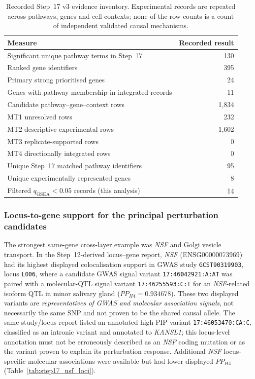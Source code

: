 \documentclass[11pt,a4paper]{article}
\begin{document}
\begin{table}[!htbp]
\centering\small
\caption{Recorded Step~17 v3 evidence inventory. Experimental records are repeated across pathways, genes and cell contexts; none of the row counts is a count of independent validated causal mechanisms.}
\label{tab:step17_inventory}
\begin{tabular}{@{}lr@{}}\toprule
Measure & Recorded result\\\midrule
Significant unique pathway terms in Step~17 & 130\\
Ranked gene identifiers & 395\\
Primary strong prioritised genes & 24\\
Genes with pathway membership in integrated records & 11\\
Candidate pathway--gene--context rows & 1,834\\
MT1 unresolved rows & 232\\
MT2 descriptive experimental rows & 1,602\\
MT3 replicate-supported rows & 0\\
MT4 directionally integrated rows & 0\\
Unique Step~17 matched pathway identifiers & 95\\
Unique experimentally represented genes & 8\\
Filtered $q_{\mathrm{GSEA}}<0.05$ records (this analysis) & 14\\
\bottomrule\end{tabular}
\end{table}

\subsubsection{Locus-to-gene support for the principal perturbation candidates}
\label{subsec:step17_variant_linkage}
The strongest same-gene cross-layer example was \textit{NSF} and Golgi vesicle transport. In the Step~12-derived locus--gene report, \textit{NSF} (ENSG00000073969) had its highest displayed colocalisation support in GWAS study \texttt{GCST90319903}, locus \texttt{L006}, where a candidate GWAS signal variant \texttt{17:46042921:A:AT} was paired with a molecular-QTL signal variant \texttt{17:46255593:C:T} for an \textit{NSF}-related isoform QTL in minor salivary gland ($PP_{H4}=0.934678$). These two displayed variants are \emph{representatives of GWAS and molecular association signals}, not necessarily the same SNP and not proven to be the shared causal allele. The same study/locus report listed an annotated high-PIP variant \texttt{17:46053470:CA:C}, classified as an intronic variant and annotated to \textit{KANSL1}; this locus-level annotation must not be erroneously described as an \textit{NSF} coding mutation or as the variant proven to explain its perturbation response. Additional \textit{NSF} locus-specific molecular associations were available but had lower displayed $PP_{H4}$ (Table~\ref{tab:step17_nsf_loci}).
\end{document}
